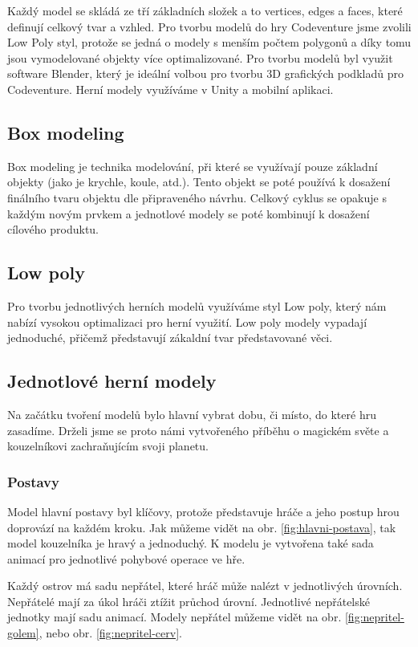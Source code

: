 Každý model se skládá ze tří základních složek a to vertices, edges a faces, které definují celkový tvar a vzhled. Pro tvorbu modelů do hry Codeventure jsme zvolili Low Poly styl, protože se jedná o modely s menším počtem polygonů a díky tomu jsou vymodelované objekty více optimalizované. Pro tvorbu modelů byl využit software Blender, který je ideální volbou pro tvorbu 3D grafických podkladů pro Codeventure. Herní modely využíváme v Unity a mobilní aplikaci.

\subsection{Box modeling}
Box modeling je technika modelování, při které se využívají pouze základní objekty (jako je krychle, koule, atd.). Tento objekt se poté používá k dosažení finálního tvaru objektu dle připraveného návrhu. Celkový cyklus se opakuje s každým novým prvkem a jednotlové modely se poté kombinují k dosažení cílového produktu.

\subsection{Low poly}
Pro tvorbu jednotlivých herních modelů využíváme styl Low poly, který nám nabízí vysokou optimalizaci pro herní využití. Low poly modely vypadají jednoduché, přičemž představují zákaldní tvar představované věci.

\subsection{Jednotlové herní modely}
Na začátku tvoření modelů bylo hlavní vybrat dobu, či místo, do které hru zasadíme. Drželi jsme se proto námi vytvořeného příběhu o magickém světe a kouzelníkovi zachraňujícím svoji planetu.

\subsubsection{Postavy}
Model hlavní postavy byl klíčovy, protože představuje hráče a jeho postup hrou doprovází na každém kroku. Jak můžeme vidět na obr. \ref{fig:hlavni-postava}, tak model kouzelníka je hravý a jednoduchý. K modelu je vytvořena také sada animací pro jednotlivé pohybové operace ve hře.

Každý ostrov má sadu nepřátel, které hráč může nalézt v jednotlivých úrovních. Nepřátelé mají za úkol hráči ztížit průchod úrovní. Jednotlivé nepřátelské jednotky mají sadu animací. Modely nepřátel můžeme vidět na obr. \ref{fig:nepritel-golem}, nebo obr. \ref{fig:nepritel-cerv}.

